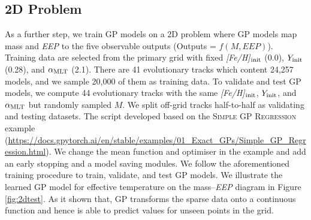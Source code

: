 \subsection{2D Problem}\label{sec:2d}

As a further step, we train GP models on a 2D problem where GP models map mass and {\it EEP} to the five observable outputs (Outputs = $f(M, EEP)$). Training data are selected from the primary grid with fixed {\it [Fe/H]}$_{\rm init}$ (0.0), $Y_{\rm init}$ (0.28), and $\alpha_{\rm MLT}$ (2.1). There are 41 evolutionary tracks which content 24,257 models, and we sample 20,000 of them as training data. To validate and test GP models, we compute 44 evolutionary tracks with the same {\it [Fe/H]}$_{\rm init}$, $Y_{\rm init}$, and $\alpha_{\rm MLT}$ but randomly sampled $M$. We split off-grid tracks half-to-half as validating and testing datasets. 
%
The script developed based on the \textsc{Simple GP Regression} example (\url{https://docs.gpytorch.ai/en/stable/examples/01_Exact_GPs/Simple_GP_Regression.html}). We change the mean function and optimiser in the example and add an early stopping and a model saving modules.  
%
We follow the aforementioned training procedure to train, validate, and test GP models. We illustrate the learned GP model for effective temperature on the mass--{\it EEP} diagram in Figure \ref{fig:2dtest}. As it shown that, GP transforms the sparse data onto a continuous function and hence is able to predict values for unseen points in the grid. 
%

